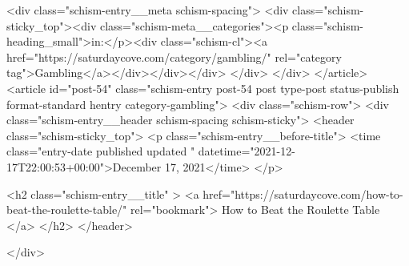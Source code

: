 {		<div class="schism-entry__meta schism-spacing">			<div class="schism-sticky_top"><div class="schism-meta__categories"><p class="schism-heading_small">in:</p><div class="schism-cl"><a href="https://saturdaycove.com/category/gambling/" rel="category tag">Gambling</a></div></div></div>		</div>
	</div>
</article>
<article id="post-54" class="schism-entry post-54 post type-post status-publish format-standard hentry category-gambling">
	<div class="schism-row">		<div class="schism-entry__header schism-spacing schism-sticky">			<header class="schism-sticky_top">				<p class="schism-entry__before-title">
					<time class="entry-date published updated " datetime="2021-12-17T22:00:53+00:00">December 17, 2021</time>				</p>

				<h2 class="schism-entry__title" >
					<a href="https://saturdaycove.com/how-to-beat-the-roulette-table/" rel="bookmark">
						How to Beat the Roulette Table					</a>
				</h2>
			</header>

					</div>

}
